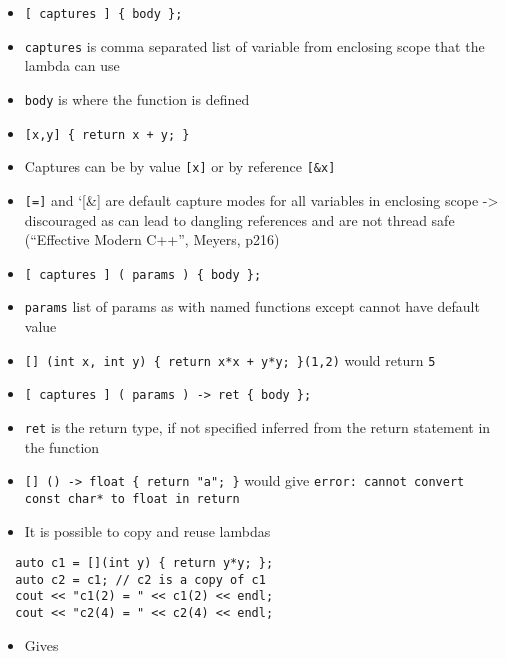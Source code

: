 \begin{itemize}
\item
  \texttt{{[} captures {]} \{ body \};}
\item
  \texttt{captures} is comma separated list of variable from enclosing
  scope that the lambda can use
\item
  \texttt{body} is where the function is defined
\item
  \texttt{{[}x,y{]} \{ return x + y; \}}
\item
  Captures can be by value \texttt{{[}x{]}} or by reference
  \texttt{{[}\&x{]}}
\item
  \texttt{{[}={]}} and `{[}\&{]} are default capture modes for all
  variables in enclosing scope -\textgreater{} discouraged as can lead
  to dangling references and are not thread safe (``Effective Modern
  C++'', Meyers, p216)
\item
  \texttt{{[} captures {]} ( params ) \{ body \};}
\item
  \texttt{params} list of params as with named functions except cannot
  have default value
\item
  \texttt{{[}{]} (int x, int y) \{ return x*x + y*y; \}(1,2)} would
  return \texttt{5}
\item
  \texttt{{[} captures {]} ( params ) -\textgreater{} ret \{ body \};}
\item
  \texttt{ret} is the return type, if not specified inferred from the
  return statement in the function
\item
  \texttt{{[}{]} () -\textgreater{} float \{ return "a"; \}} would give
  \texttt{error: cannot convert const char* to float in return}
\item
  It is possible to copy and reuse lambdas
\end{itemize}

\begin{verbatim}
  auto c1 = [](int y) { return y*y; };
  auto c2 = c1; // c2 is a copy of c1
  cout << "c1(2) = " << c1(2) << endl;
  cout << "c2(4) = " << c2(4) << endl;
\end{verbatim}

\begin{itemize}
\itemsep1pt\parskip0pt
\item
  Gives
\end{itemize}

\begin{Shaded}
\begin{Highlighting}[]
\NormalTok{) = }
\NormalTok{) = }
\end{Highlighting}
\end{Shaded}

